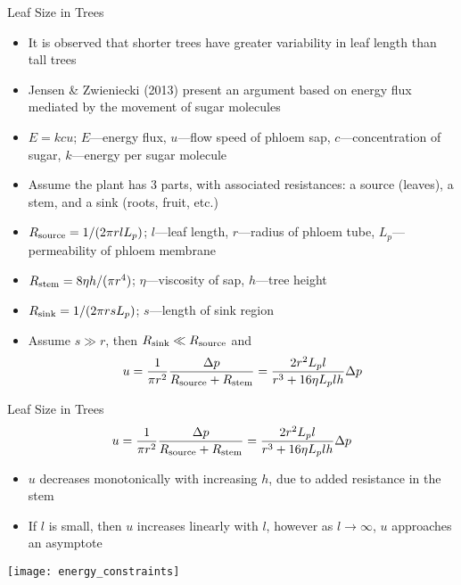 \documentclass[10pt]{beamer}
\newcommand{\tn}{\textnormal}
\begin{document}
\begin{frame}{Leaf Size in Trees}
  \begin{itemize}
  \item It is observed that shorter trees have greater variability in
    leaf length than tall trees
  \item Jensen \& Zwieniecki (2013) present an argument based on
    energy flux mediated by the movement of sugar molecules
  \item $E = k c u$; $E$---energy flux, $u$---flow speed of phloem
    sap, $c$---concentration of sugar, $k$---energy per sugar molecule
  \item Assume the plant has 3 parts, with associated resistances: a
    source (leaves), a stem, and a sink (roots, fruit, etc.)
  \item $R_\tn{source} = 1 / (2\pi r l L_p)$; $l$---leaf length,
    $r$---radius of phloem tube, $L_p$---permeability of phloem
    membrane
  \item $R_\tn{stem} = 8 \eta h / (\pi r^4)$; $\eta$---viscosity of
    sap, $h$---tree height
  \item $R_\tn{sink} = 1 / (2\pi r s L_p)$; $s$---length of sink
    region
  \item Assume $s \gg r$, then $R_\tn{sink} \ll R_\tn{source}$ and
    \begin{equation*}
      u = \frac{1}{\pi r^2} \frac{\Delta p}{R_\tn{source} +
        R_\tn{stem}} = \frac{2 r^2 L_p l}{r^3 + 16 \eta L_p l h}
      \Delta p
    \end{equation*}
  \end{itemize}
\end{frame}

\begin{frame}{Leaf Size in Trees}
  \begin{equation*}
    u = \frac{1}{\pi r^2} \frac{\Delta p}{R_\tn{source} +
      R_\tn{stem}} = \frac{2 r^2 L_p l}{r^3 + 16 \eta L_p l h}
    \Delta p
  \end{equation*}
  \begin{itemize}
  \item $u$ decreases monotonically with increasing $h$, due to added
    resistance in the stem
  \item If $l$ is small, then $u$ increases linearly with $l$, however
    as $l \rightarrow \infty$, $u$ approaches an asymptote
  \end{itemize}
  \texttt{[image: energy\_constraints]}
\end{frame}
\end{document}
